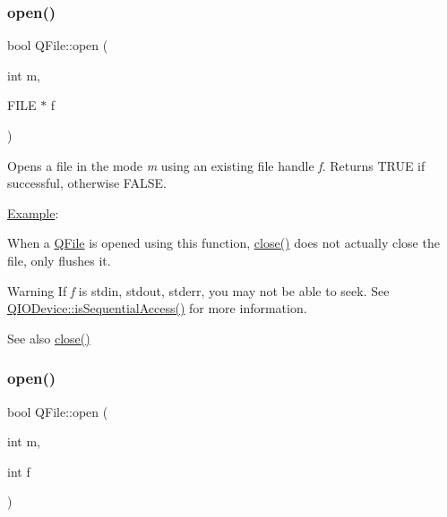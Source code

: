 \subsubsection{\texorpdfstring{open()}{open()}\hspace{0.1cm}{\footnotesize\ttfamily [2/3]}}
{\footnotesize\ttfamily bool Q\+File\+::open (\begin{DoxyParamCaption}\item[{int}]{m,  }\item[{F\+I\+LE $\ast$}]{f }\end{DoxyParamCaption})}

Opens a file in the mode {\itshape m} using an existing file handle {\itshape f}. Returns T\+R\+UE if successful, otherwise F\+A\+L\+SE.

\mbox{\hyperlink{struct_example}{Example}}\+: 
\begin{DoxyCode}{0}
\DoxyCodeLine{\textcolor{preprocessor}{\#include <stdio.h>}}
\DoxyCodeLine{}
\DoxyCodeLine{\{}
\DoxyCodeLine{\}}
\end{DoxyCode}


When a \mbox{\hyperlink{class_q_file}{Q\+File}} is opened using this function, \mbox{\hyperlink{class_q_file_ac0d8375a5ea7d4503545d7c68dcf58e1}{close()}} does not actually close the file, only flushes it.

\begin{DoxyWarning}{Warning}
If {\itshape f} is {\ttfamily stdin}, {\ttfamily stdout}, {\ttfamily stderr}, you may not be able to seek. See \mbox{\hyperlink{class_q_i_o_device_ab0c6f50325bbf1e860aed41f3bfa498c}{Q\+I\+O\+Device\+::is\+Sequential\+Access()}} for more information.
\end{DoxyWarning}
\begin{DoxySeeAlso}{See also}
\mbox{\hyperlink{class_q_file_ac0d8375a5ea7d4503545d7c68dcf58e1}{close()}} 
\end{DoxySeeAlso}
\mbox{\label{class_q_file_ac09fbb92aa5fe9e11c6d282e12a72ae5}} 
\subsubsection{\texorpdfstring{open()}{open()}\hspace{0.1cm}{\footnotesize\ttfamily [3/3]}}
{\footnotesize\ttfamily bool Q\+File\+::open (\begin{DoxyParamCaption}\item[{int}]{m,  }\item[{int}]{f }\end{DoxyParamCaption})}

